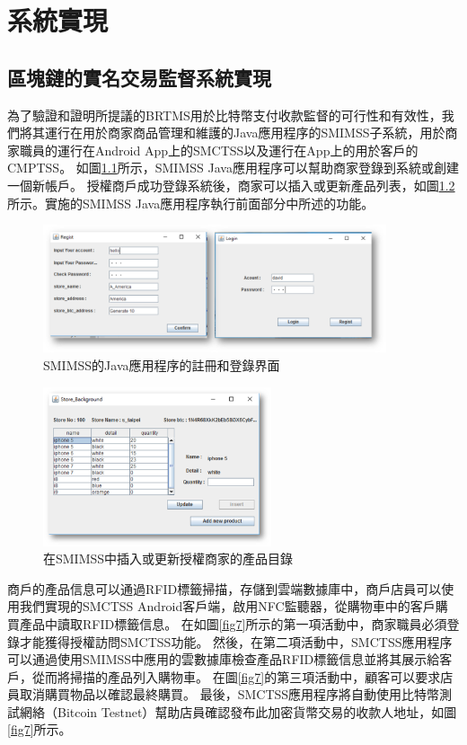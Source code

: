 
\chapter{系統實現}

\section{區塊鏈的實名交易監督系統實現}

為了驗證和證明所提議的BRTMS用於比特幣支付收款監督的可行性和有效性，我們將其運行在用於商家商品管理和維護的Java應用程序的SMIMSS子系統，用於商家職員的運行在Android App上的SMCTSS以及運行在App上的用於客戶的CMPTSS。
如圖\ref{fig5}所示，SMIMSS Java應用程序可以幫助商家登錄到系統或創建一個新帳戶。 授權商戶成功登錄系統後，商家可以插入或更新產品列表，如圖\ref{fig6}所示。實施的SMIMSS Java應用程序執行前面部分中所述的功能。

\begin{figure}[htbp]
	\centering
	\includegraphics[width = 0.9\textwidth]{fig5.png}
	\caption{SMIMSS的Java應用程序的註冊和登錄界面}\label{fig5}
\end{figure}

\begin{figure}[htbp]
	\centering
	\includegraphics[width = 0.6\textwidth]{fig6.png}
	\caption{在SMIMSS中插入或更新授權商家的產品目錄}\label{fig6}
\end{figure}

商戶的產品信息可以通過RFID標籤掃描，存儲到雲端數據庫中，商戶店員可以使用我們實現的SMCTSS Android客戶端，啟用NFC監聽器，從購物車中的客戶購買產品中讀取RFID標籤信息。 在如圖\ref{fig7}所示的第一項活動中，商家職員必須登錄才能獲得授權訪問SMCTSS功能。 然後，在第二項活動中，SMCTSS應用程序可以通過使用SMIMSS中應用的雲數據庫檢查產品RFID標籤信息並將其展示給客戶，從而將掃描的產品列入購物車。 在圖\ref{fig7}的第三項活動中，顧客可以要求店員取消購買物品以確認最終購買。 最後，SMCTSS應用程序將自動使用比特幣測試網絡（Bitcoin Testnet）\supercite{bitcointestnet}幫助店員確認發布此加密貨幣交易的收款人地址，如圖\ref{fig7}所示。    

